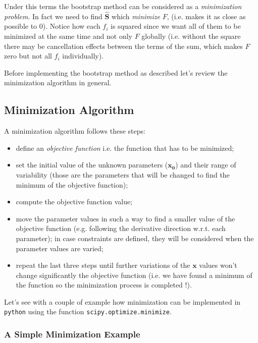 Under this terms the bootstrap method can be considered as a \emph{minimization problem}. In fact we need to find $\mathbf{\hat{S}}$ which \emph{minimize} $F$, (i.e. makes it as close as possible to 0).
Notice how each \(f_i\) is squared since we want all of them to be minimized at the same time and not only \(F\) globally (i.e. without the square there may be cancellation effects between the terms of the sum, which makes $F$ zero but not all $f_i$ individually).

Before implementing the bootstrap method as described let's review the minimization algorithm in general.

\subsection{Minimization Algorithm}
\label{minimization-algorithm}

A minimization algorithm follows these steps:

\begin{itemize}
\tightlist
\item
  define an \emph{objective function} i.e. the function that has to be minimized;
\item
  set the initial value of the unknown parameters (\(\mathbf{x_0}\)) and their range of variability (those are the parameters that will be changed to find the minimum of the objective function);
\item
  compute the objective function value;
\item
  move the parameter values in such a way to find a smaller value of the objective function (e.g. following the derivative direction w.r.t. each parameter); in case constraints are defined, they will be considered when the parameter values are varied;
\item
  repeat the last three steps until further variations of the \(\mathbf{x}\) values won't change significantly the objective
  function (i.e. we have found a minimum of the function so the minimization process is completed !).
\end{itemize}

Let's see with a couple of example how minimization can be implemented in \texttt{python} using the function \texttt{scipy.optimize.minimize}.

\subsubsection{A Simple Minimization Example}
\label{example}

